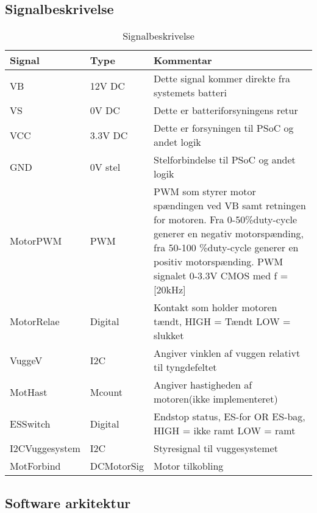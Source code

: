 \subsection*{Signalbeskrivelse}
\begin{center}
\begin{longtable}{|p{3cm}|p{2cm}|p{6cm}|}
\caption[Signalbeskrivelse for vuggesystem]{Signalbeskrivelse} 

\label{signalbeskr_vugge_tabel} \\

\hline 

\multicolumn{1}{|p{3cm}|}{\textbf{Signal}} & 
\multicolumn{1}{p{2cm}|}{\textbf{Type}} & 
\multicolumn{1}{p{6cm}|}{\textbf{Kommentar}} \\
\hline 

\endhead




\hline \hline
\endlastfoot

VB & 12V DC & Dette signal kommer direkte fra systemets batteri\\
\hline
VS & 0V DC & Dette er batteriforsyningens retur\\
\hline
VCC & 3.3V DC & Dette er forsyningen til PSoC og andet logik\\
\hline
GND & 0V stel & Stelforbindelse til PSoC og andet logik\\
\hline
MotorPWM & PWM & PWM som styrer motor spændingen ved VB samt retningen for motoren. Fra 0-50\%duty-cycle generer en negativ motorspænding, fra 50-100 \%duty-cycle generer en positiv motorspænding.  PWM signalet 0-3.3V CMOS med f = [20kHz]\\
\hline
MotorRelae & Digital & Kontakt som holder motoren tændt,  HIGH = Tændt LOW = slukket  \\
\hline
VuggeV & I2C & Angiver vinklen af vuggen relativt til tyngdefeltet\\
\hline
MotHast & Mcount & Angiver hastigheden af motoren(ikke implementeret)\\
\hline
ESSwitch & Digital & Endstop status, ES-for OR ES-bag, HIGH = ikke ramt LOW = ramt\\
\hline
I2CVuggesystem & I2C & Styresignal til vuggesystemet\\
\hline
MotForbind & DCMotorSig & Motor tilkobling\\
\hline

\end{longtable}
\end{center}

\newpage
\subsection{Software arkitektur}
\label{Vuggesystem: Software}

